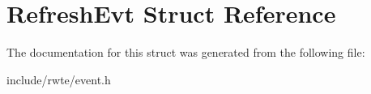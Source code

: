 \hypertarget{structRefreshEvt}{}\section{Refresh\+Evt Struct Reference}
\label{structRefreshEvt}


The documentation for this struct was generated from the following file\+:\begin{DoxyCompactItemize}
\item 
include/rwte/event.\+h\end{DoxyCompactItemize}
